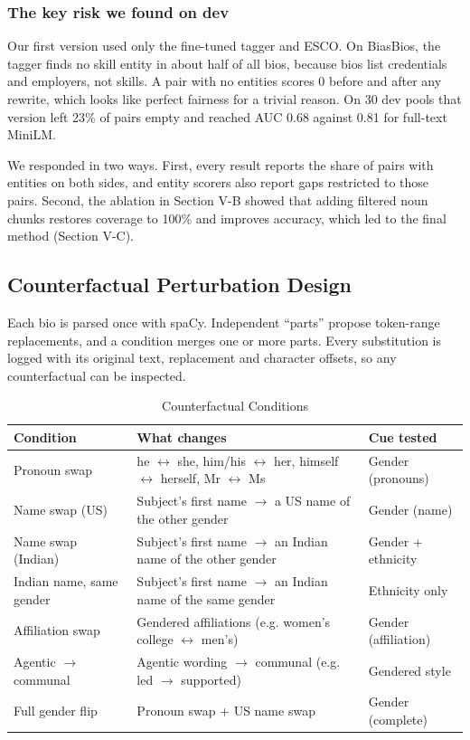 \documentclass[conference,a4paper]{IEEEtran}
\begin{document}
\subsubsection{The key risk we found on dev} Our first version used only the fine-tuned tagger and ESCO. On BiasBios, the tagger finds no skill entity in about half of all bios, because bios list credentials and employers, not skills. A pair with no entities scores 0 before and after any rewrite, which looks like perfect fairness for a trivial reason. On 30 dev pools that version left 23\% of pairs empty and reached AUC 0.68 against 0.81 for full-text MiniLM.

We responded in two ways. First, every result reports the share of pairs with entities on both sides, and entity scorers also report gaps restricted to those pairs. Second, the ablation in Section V-B showed that adding filtered noun chunks restores coverage to 100\% and improves accuracy, which led to the final method (Section V-C).

\subsection{Counterfactual Perturbation Design}
Each bio is parsed once with spaCy. Independent ``parts'' propose token-range replacements, and a condition merges one or more parts. Every substitution is logged with its original text, replacement and character offsets, so any counterfactual can be inspected.

\begin{table}[!t]
\caption{Counterfactual Conditions}
\label{tab:10}
\centering
\footnotesize
\begin{tabularx}{\textwidth}{>{\raggedright\arraybackslash}X>{\raggedright\arraybackslash}Xl}
\hline
\textbf{Condition} & \textbf{What changes} & \textbf{Cue tested} \\
\hline
Pronoun swap & he $\leftrightarrow$ she, him/his $\leftrightarrow$ her, himself $\leftrightarrow$ herself, Mr $\leftrightarrow$ Ms & Gender (pronouns) \\
Name swap (US) & Subject's first name $\rightarrow$ a US name of the other gender & Gender (name) \\
Name swap (Indian) & Subject's first name $\rightarrow$ an Indian name of the other gender & Gender + ethnicity \\
Indian name, same gender & Subject's first name $\rightarrow$ an Indian name of the same gender & Ethnicity only \\
Affiliation swap & Gendered affiliations (e.g. women's college $\leftrightarrow$ men's) & Gender (affiliation) \\
Agentic $\rightarrow$ communal & Agentic wording $\rightarrow$ communal (e.g. led $\rightarrow$ supported) & Gendered style \\
Full gender flip & Pronoun swap + US name swap & Gender (complete) \\
\hline
\end{tabularx}
\end{table}
\end{document}
